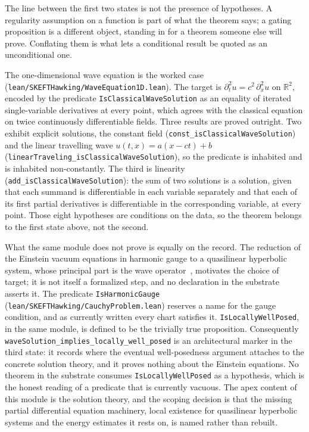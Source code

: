 \documentclass[11pt]{article}
\begin{document}
The line between the first two states is not the presence of
hypotheses. A regularity assumption on a function is part of what
the theorem says; a gating proposition is a different object,
standing in for a theorem someone else will prove. Conflating them
is what lets a conditional result be quoted as an unconditional one.

The one-dimensional wave equation is the worked case
(\texttt{lean/SKEFTHawking/WaveEquation1D.lean}). The target is
$\partial_t^2 u = c^2\, \partial_x^2 u$ on $\mathbb{R}^2$, encoded by
the predicate \texttt{IsClassicalWaveSolution} as an equality of
iterated single-variable derivatives at every point, which agrees
with the classical equation on twice continuously differentiable
fields. Three results are proved outright. Two exhibit explicit
solutions, the constant field
(\texttt{const\_isClassicalWaveSolution}) and the linear travelling
wave $u(t,x) = a(x - ct) + b$
(\texttt{linearTraveling\_isClassicalWaveSolution}), so the predicate
is inhabited and is inhabited non-constantly. The third is linearity
(\texttt{add\_isClassicalWaveSolution}): the sum of two solutions is
a solution, given that each summand is differentiable in each
variable separately and that each of its first partial derivatives
is differentiable in the corresponding variable, at every point.
Those eight hypotheses are conditions on the data, so the theorem
belongs to the first state above, not the second.

What the same module does not prove is equally on the record. The
reduction of the Einstein vacuum equations in harmonic gauge to a
quasilinear hyperbolic system, whose principal part is the wave
operator~\cite{FouresBruhat1952,FriedrichRendall2000}, motivates the
choice of target; it is not itself a formalized step, and no declaration
in the substrate asserts it. The
predicate \texttt{IsHarmonicGauge}
(\texttt{lean/SKEFTHawking/CauchyProblem.lean}) reserves a name for
the gauge condition, and as currently written every chart satisfies
it. \texttt{IsLocallyWellPosed}, in the same module, is defined to be
the trivially true proposition. Consequently
\texttt{waveSolution\_implies\_locally\_well\_posed} is an
architectural marker in the third state: it records where the
eventual well-posedness argument attaches to the concrete solution
theory, and it proves nothing about the Einstein equations. No
theorem in the substrate consumes \texttt{IsLocallyWellPosed} as a
hypothesis, which is the honest reading of a predicate that is
currently vacuous. The apex content of this module is the solution
theory, and the scoping decision is that the missing partial
differential equation machinery, local existence for quasilinear
hyperbolic systems and the energy estimates it rests on, is named
rather than rebuilt.
\end{document}
